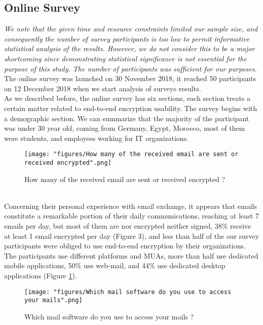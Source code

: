 \subsection{Online Survey}
\textit{We note that the given time and resource constraints limited our sample size, and consequently the number of survey participants is too low to permit informative statistical analysis of the results. However, we do not consider this to be a major shortcoming since demonstrating statistical significance is not essential for the purpose of this study. The number of participants was sufficient for our purposes.}\\
The online survey was launched on 30 November 2018, it reached 50 participants on 12 December 2018 when we start analysis of surveys results.\\
As we described before, the online survey has six sections, each section treats a certain matter related to end-to-end encryption usability. The survey begins with a demographic section. We can summarize that the majority of the participant was under 30 year old, coming from Germany, Egypt, Morocco, most of them were students, and employees working for IT organizations.\\
\begin{figure}
	\texttt{[image: "figures/How many of the received email are sent or received encrypted".png]}
	\centering
	\caption{How many of the received email are sent or received encrypted ?}
\end{figure}\\
Concerning their personal experience with email exchange, it appears that emails constitute a remarkable portion of their daily communications, reaching at least 7 emails per day, but most of them are nor encrypted neither signed, 38\% receive at least 1 email encrypted per day (Figure 3), and less than half of the our survey participants were obliged to use end-to-end encryption by their organizations.\\
The participants use different platforms and MUAs, more than half use dedicated mobile applications, 50\% use web-mail, and 44\% use dedicated desktop applications (Figure \ref{fig:encryptedemail}).\\
\begin{figure}
	\texttt{[image: "figures/Which mail software do you use to access your mails".png]}
	\centering
	\caption{Which mail software do you use to access your mails ?}
	\label{fig:encryptedemail}
\end{figure}\\
